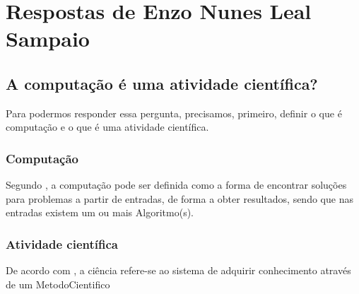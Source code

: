 \section{Respostas de Enzo Nunes Leal Sampaio}

\subsection{A computação é uma atividade científica?}
Para podermos responder essa pergunta, precisamos, primeiro, definir o que é computação e o que é uma atividade científica.

\subsubsection{Computação}
Segundo \citet{wikipedia_computacao_2022}, a computação pode ser definida como a forma de encontrar soluções para problemas a partir de entradas, de forma a obter resultados, sendo que nas entradas existem um ou mais \gls{Algoritmo}(s).

\subsubsection{Atividade científica}
De acordo com \citet{wikipedia_ciencia_2022}, a ciência refere-se ao sistema de adquirir conhecimento através de um \gls{MetodoCientifico}